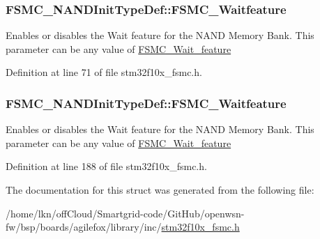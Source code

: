 \subsubsection[{\texorpdfstring{F\+S\+M\+C\+\_\+\+Waitfeature}{FSMC_Waitfeature}}]{ F\+S\+M\+C\+\_\+\+N\+A\+N\+D\+Init\+Type\+Def\+::\+F\+S\+M\+C\+\_\+\+Waitfeature}\hypertarget{struct_f_s_m_c___n_a_n_d_init_type_def_a16a252f0f8e2e28b5d85f0595682f750}{}\label{struct_f_s_m_c___n_a_n_d_init_type_def_a16a252f0f8e2e28b5d85f0595682f750}
Enables or disables the Wait feature for the N\+A\+ND Memory Bank. This parameter can be any value of \hyperlink{group___f_s_m_c___wait__feature}{F\+S\+M\+C\+\_\+\+Wait\+\_\+feature} 

Definition at line 71 of file stm32f10x\+\_\+fsmc.\+h.

\subsubsection[{\texorpdfstring{F\+S\+M\+C\+\_\+\+Waitfeature}{FSMC_Waitfeature}}]{ F\+S\+M\+C\+\_\+\+N\+A\+N\+D\+Init\+Type\+Def\+::\+F\+S\+M\+C\+\_\+\+Waitfeature}\hypertarget{struct_f_s_m_c___n_a_n_d_init_type_def_ab350e15014c4a9f4b2c2f2848f11eeca}{}\label{struct_f_s_m_c___n_a_n_d_init_type_def_ab350e15014c4a9f4b2c2f2848f11eeca}
Enables or disables the Wait feature for the N\+A\+ND Memory Bank. This parameter can be any value of \hyperlink{group___f_s_m_c___wait__feature}{F\+S\+M\+C\+\_\+\+Wait\+\_\+feature} 

Definition at line 188 of file stm32f10x\+\_\+fsmc.\+h.



The documentation for this struct was generated from the following file\+:\begin{DoxyCompactItemize}
\item 
/home/lkn/off\+Cloud/\+Smartgrid-\/code/\+Git\+Hub/openwsn-\/fw/bsp/boards/agilefox/library/inc/\hyperlink{agilefox_2library_2inc_2stm32f10x__fsmc_8h}{stm32f10x\+\_\+fsmc.\+h}\end{DoxyCompactItemize}
